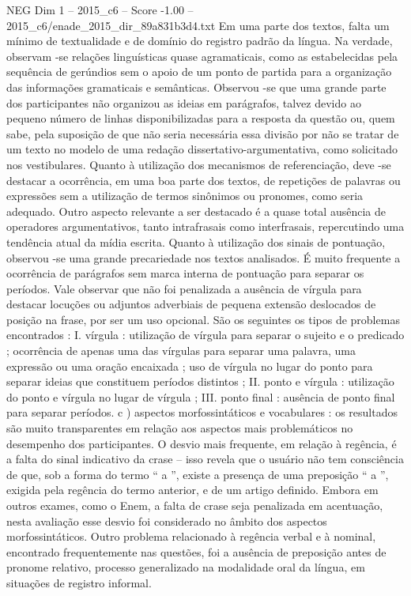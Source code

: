 \begin{textsample}{NEG Dim 1 – 2015\_c6 – Score -1.00 – 2015\_c6/enade\_2015\_dir\_89a831b3d4.txt}
Em uma parte dos textos, falta um mínimo de textualidade e de domínio do registro padrão da língua.
Na verdade, observam -se relações linguísticas quase agramaticais, como as estabelecidas pela sequência de gerúndios sem o apoio de um ponto de partida para a organização das informações gramaticais e semânticas.
Observou -se que uma grande parte dos participantes não organizou as ideias em parágrafos, talvez devido ao pequeno número de linhas disponibilizadas para a resposta da questão ou, quem sabe, pela suposição de que não seria necessária essa divisão por não se tratar de um texto no modelo de uma redação dissertativo-argumentativa, como solicitado nos vestibulares.
Quanto à utilização dos mecanismos de referenciação, deve -se destacar a ocorrência, em uma boa parte dos textos, de repetições de palavras ou expressões sem a utilização de termos sinônimos ou pronomes, como seria adequado.
Outro aspecto relevante a ser destacado é a quase total ausência de operadores argumentativos, tanto intrafrasais como interfrasais, repercutindo uma tendência atual da mídia escrita.
Quanto à utilização dos sinais de pontuação, observou -se uma grande precariedade nos textos analisados.
É muito frequente a ocorrência de parágrafos sem marca interna de pontuação para separar os períodos.
Vale observar que não foi penalizada a ausência de vírgula para destacar locuções ou adjuntos adverbiais de pequena extensão deslocados de posição na frase, por ser um uso opcional.
São os seguintes os tipos de problemas encontrados : I. vírgula : utilização de vírgula para separar o sujeito e o predicado ; ocorrência de apenas uma das vírgulas para separar uma palavra, uma expressão ou uma oração encaixada ; uso de vírgula no lugar do ponto para separar ideias que constituem períodos distintos ; II. ponto e vírgula : utilização do ponto e vírgula no lugar de vírgula ; III. ponto final : ausência de ponto final para separar períodos. c ) aspectos morfossintáticos e vocabulares : os resultados são muito transparentes em relação aos aspectos mais problemáticos no desempenho dos participantes.
O desvio mais frequente, em relação à regência, é a falta do sinal indicativo da crase – isso revela que o usuário não tem consciência de que, sob a forma do termo “ a ”, existe a presença de uma preposição “ a ”, exigida pela regência do termo anterior, e de um artigo definido.
Embora em outros exames, como o Enem, a falta de crase seja penalizada em acentuação, nesta avaliação esse desvio foi considerado no âmbito dos aspectos morfossintáticos.
Outro problema relacionado à regência verbal e à nominal, encontrado frequentemente nas questões, foi a ausência de preposição antes de pronome relativo, processo generalizado na modalidade oral da língua, em situações de registro informal.

\end{textsample}
